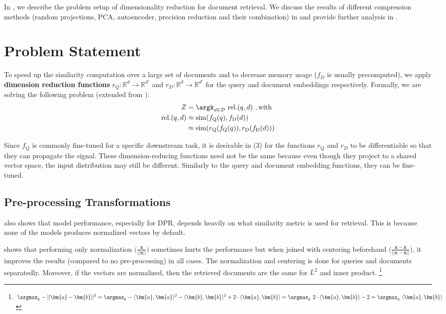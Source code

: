 In , we describe the problem setup of dimensionality reduction for document retrieval.
We discuss the results of different compression methods (random projections, PCA, autoencoder, precision reduction and their combination) in  and provide further analysis in .

\section{Problem Statement} \label{sec:methods}

To speed up the similarity computation over a large set of documents and to decrease memory usage ($f_D$ is usually precomputed), we apply \textbf{dimension reduction functions} $r_Q : \mathbb{R}^d \rightarrow \mathbb{R}^{d'}$ and $r_D : \mathbb{R}^d \rightarrow \mathbb{R}^{d'}$ for the query and document embeddings respectively. Formally, we are solving the following problem (extended from ):
\begin{align}
Z &= \argk_{d \in \mathcal{D}}~ \text{rel.}(q, d)~, \text{with}\\
\text{rel.}(q, d) &\approx \text{sim}(f_\text{Q}(q), f_\text{D}(d)) \\
&\approx \text{sim}(r_\text{Q}(f_\text{Q}(q)), r_\text{D}(f_\text{D}(d)))
\end{align}

Since $f_Q$ is commonly fine-tuned for a specific downstream task, it is desirable in (3) for the functions $r_Q$ and $r_D$ to be differentiable so that they can propagate the signal.
These dimension-reducing functions need not be the same because even though they project to a shared vector space, the input distribution may still be different.
Similarly to the query and document embedding functions, they can be fine-tuned.

\subsection{Pre-processing Transformations}

 also shows that model performance, especially for DPR, depends heavily on what similarity metric is used for retrieval.
This is because none of the models produces normalized vectors by default.

 shows that performing only normalization $\big(\frac{\bm{x}}{||\bm{x}||}\big)$ sometimes hurts the performance but when joined with centering beforehand $\big(\frac{\bm{x}-\bar{\bm{x}}}{||\bm{x}-\bar{\bm{x}}||}\big)$, it improves the results (compared to no pre-processing) in all cases.
The normalization and centering is done for queries and documents separatedly.
Moreover, if the vectors are normalized, then the retrieved documents are the same for $L^2$ and inner product.
\footnote{$
\argmax_k -||\bm{a}-\bm{b}||^2 =
\argmax_k -\langle \bm{a},\bm{a} \rangle^2 - \langle \bm{b},\bm{b} \rangle^2 + 2\cdot \langle \bm{a},\bm{b} \rangle =
\argmax_k\ 2\cdot \langle \bm{a},\bm{b} \rangle - 2 = \argmax_k\ \langle \bm{a},\bm{b} \rangle$}

